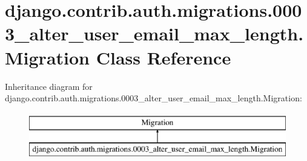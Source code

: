 \hypertarget{classdjango_1_1contrib_1_1auth_1_1migrations_1_10003__alter__user__email__max__length_1_1_migration}{}\section{django.\+contrib.\+auth.\+migrations.0003\+\_\+alter\+\_\+user\+\_\+email\+\_\+max\+\_\+length.Migration Class Reference}
\label{classdjango_1_1contrib_1_1auth_1_1migrations_1_10003__alter__user__email__max__length_1_1_migration}
Inheritance diagram for django.\+contrib.\+auth.\+migrations.0003\+\_\+alter\+\_\+user\+\_\+email\+\_\+max\+\_\+length.Migration\+:\begin{figure}[H]
\begin{center}
\leavevmode
\includegraphics[height=2.000000cm]{classdjango_1_1contrib_1_1auth_1_1migrations_1_10003__alter__user__email__max__length_1_1_migration}
\end{center}
\end{figure}
